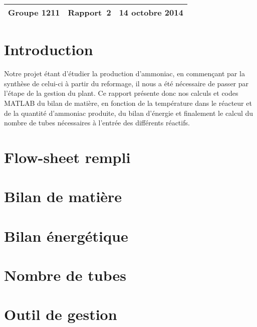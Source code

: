 \documentclass[a4paper,12pt]{article}
\begin{document}
\begin{center}
\begin{tabu} to \textwidth {lX[c]r}
    Groupe 1211 & \large{\textbf{Rapport~2}} & 14 octobre 2014 \\
    \hline
\end{tabu}
\end{center}

\section{Introduction}

Notre projet étant d’étudier la production d’ammoniac, en commençant par la synthèse de celui-ci à partir du reformage, il nous a été nécessaire de passer par l’étape de la gestion du plant. Ce rapport présente donc nos calculs et codes MATLAB du bilan de matière, en fonction de la température dans le réacteur et de la quantité d’ammoniac produite, du bilan d’énergie et finalement le calcul du nombre de tubes nécessaires à l’entrée des différents réactifs. 

\section{Flow-sheet rempli}
\section{Bilan de matière}
\section{Bilan énergétique}
\section{Nombre de tubes}
\section{Outil de gestion}

\printbibliography[heading=bibintoc]
\end{document}
